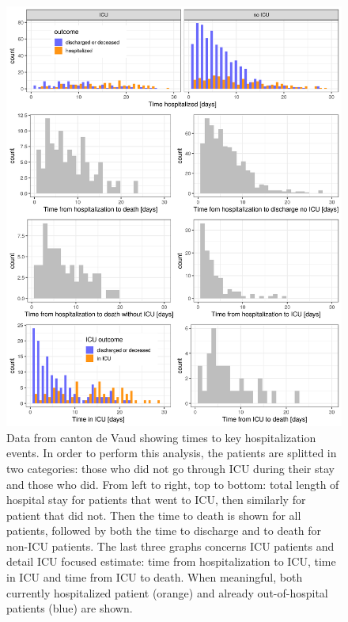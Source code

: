 \begin{figure}[!htb]
    \centering
    \includegraphics{fig_covid-switzerland-npi/fig_supp/VD_times.png}
    \caption[Key data of hospitalization events in canton de Vaud]{Data from canton de Vaud showing times to key hospitalization events. In order to perform this analysis, the patients are splitted in two categories: those who did not go through ICU during their stay and those who did. From left to right, top to bottom: total length of hospital stay for patients that went to ICU, then similarly for patient that did not. Then the time to death is shown for all patients, followed by both the time to discharge and to death for non-ICU patients. The last three graphs concerns ICU patients and detail ICU focused estimate: time from hospitalization to ICU, time in ICU and time from ICU to death. When meaningful, both currently hospitalized patient (orange) and already out-of-hospital patients (blue) are shown.}
    \label{fig:vdtimes}
\end{figure}

